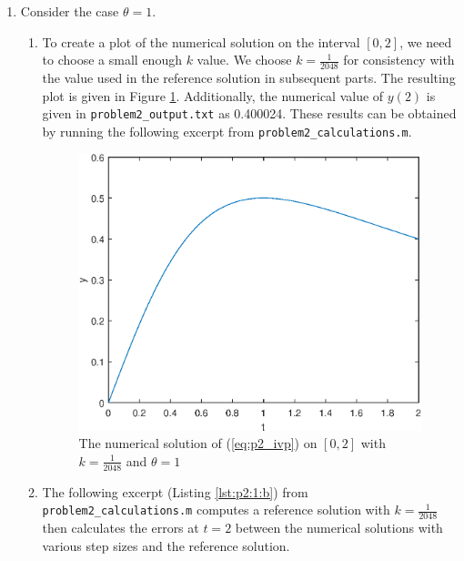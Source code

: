 \documentclass{homework}
\begin{document}
	\begin{enumerate}
		\item Consider the case $\theta = 1$.
		\begin{enumerate}[label={(\alph*)}]
			\item To create a plot of the numerical solution on the interval $[0,2]$, we need to choose a small enough $k$ value. We choose $k = \frac{1}{2048}$ for consistency with the value used in the reference solution in subsequent parts. The resulting plot is given in Figure \ref{fig:p2_part1}. Additionally, the numerical value of $y(2)$ is given in \lstinline{problem2_output.txt} as 0.400024. These results can be obtained by running the following excerpt from \lstinline{problem2_calculations.m}.
			
			
			
			\begin{figure}[h]
				\centering
				\includegraphics{p2_1_plot.eps}
				\caption{The numerical solution of (\ref{eq:p2_ivp}) on $[0,2]$ with $k = \frac{1}{2048}$ and $\theta = 1$}
				\label{fig:p2_part1}
			\end{figure}
			
			\item The following excerpt (Listing \ref{lst:p2:1:b}) from \lstinline{problem2_calculations.m} computes a reference solution with $k = \frac{1}{2048}$ then calculates the errors at $t=2$ between the numerical solutions with various step sizes and the reference solution.
			

\end{enumerate}
\end{enumerate}
\end{document}
